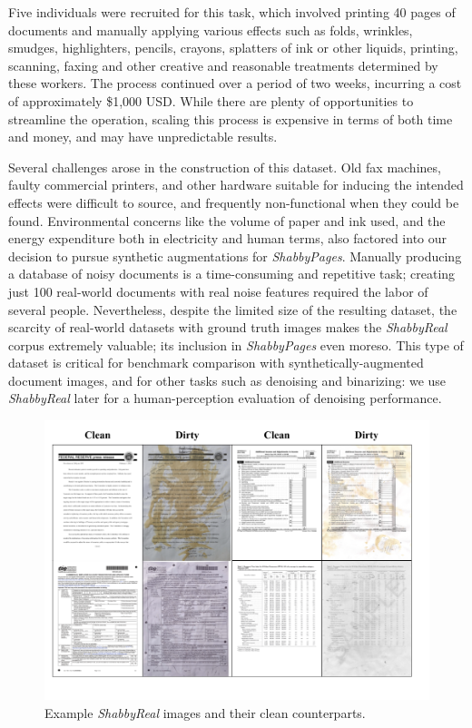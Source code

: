 \documentclass[runningheads]{llncs}
\begin{document}
Five individuals were recruited for this task, which involved printing 40 pages of documents and manually applying various effects such as folds, wrinkles, smudges, highlighters, pencils, crayons, splatters of ink or other liquids, printing, scanning, faxing and other creative and reasonable treatments determined by these workers.
The process continued over a period of two weeks, incurring a cost of approximately \$1,000 USD.
While there are plenty of opportunities to streamline the operation, scaling this process is expensive in terms of both time and money, and may have unpredictable results.

Several challenges arose in the construction of this dataset.
Old fax machines, faulty commercial printers, and other hardware suitable for inducing the intended effects were difficult to source, and frequently non-functional when they could be found.
Environmental concerns like the volume of paper and ink used, and the energy expenditure both in electricity and human terms, also factored into our decision to pursue synthetic augmentations for \emph{ShabbyPages}.
Manually producing a database of noisy documents is a time-consuming and repetitive task; creating just 100 real-world documents with real noise features required the labor of several people.
Nevertheless, despite the limited size of the resulting dataset, the scarcity of real-world datasets with ground truth images makes the \emph{ShabbyReal} corpus extremely valuable; its inclusion in \emph{ShabbyPages} even moreso.
This type of dataset is critical for benchmark comparison with synthetically-augmented document images, and for other tasks such as denoising and binarizing: we use \emph{ShabbyReal} later for a human-perception evaluation of denoising performance.

\begin{figure}
\centering
\includegraphics[width=0.98\columnwidth, frame]{figures/shabbyreal_figure1.png}
\caption{Example \emph{ShabbyReal} images and their clean counterparts.}
\label{fig:shabbyreal_sample}
\end{figure}
\end{document}
